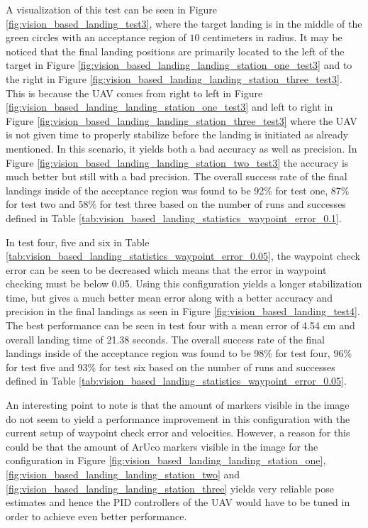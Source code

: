 \documentclass[../Head/report.tex]{subfiles}
\begin{document}
A visualization of this test can be seen in Figure \ref{fig:vision_based_landing_test3}, where the target landing is in the middle of the green circles with an acceptance region of $10$ centimeters in radius. It may be noticed that the final landing positions are primarily located to the left of the target in Figure \ref{fig:vision_based_landing_landing_station_one_test3} and to the right in Figure \ref{fig:vision_based_landing_landing_station_three_test3}. This is because the UAV comes from right to left in Figure \ref{fig:vision_based_landing_landing_station_one_test3} and left to right in Figure \ref{fig:vision_based_landing_landing_station_three_test3} where the UAV is not given time to properly stabilize before the landing is initiated as already mentioned. In this scenario, it yields both a bad accuracy as well as precision. In Figure \ref{fig:vision_based_landing_landing_station_two_test3} the accuracy is much better but still with a bad precision. The overall success rate of the final landings inside of the acceptance region was found to be 92\% for test one, 87\% for test two and 58\% for test three based on the number of runs and successes defined in Table \ref{tab:vision_based_landing_statistics_waypoint_error_0.1}. 

In test four, five and six in Table \ref{tab:vision_based_landing_statistics_waypoint_error_0.05}, the waypoint check error can be seen to be decreased which means that the error in waypoint checking must be below 0.05. Using this configuration yields a longer stabilization time, but gives a much better mean error along with a better accuracy and precision in the final landings as seen in Figure \ref{fig:vision_based_landing_test4}. The best performance can be seen in test four with a mean error of 4.54 cm and overall landing time of 21.38 seconds. The overall success rate of the final landings inside of the acceptance region was found to be 98\% for test four, 96\% for test five and 93\% for test six based on the number of runs and successes defined in Table \ref{tab:vision_based_landing_statistics_waypoint_error_0.05}.

An interesting point to note is that the amount of markers visible in the image do not seem to yield a performance improvement in this configuration with the current setup of waypoint check error and velocities. However, a reason for this could be that the amount of ArUco markers visible in the image for the configuration in Figure \ref{fig:vision_based_landing_landing_station_one}, \ref{fig:vision_based_landing_landing_station_two} and \ref{fig:vision_based_landing_landing_station_three} yields very reliable pose estimates and hence the PID controllers of the UAV would have to be tuned in order to achieve even better performance.  
\end{document}
